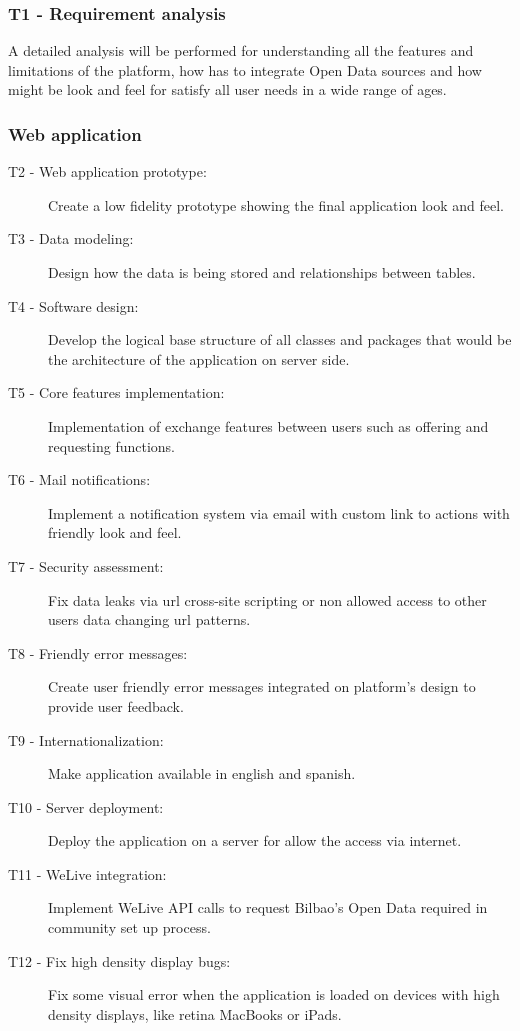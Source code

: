 \documentclass{DeustoFDP}
\begin{document}
\subsubsection{T1 - Requirement analysis}
A detailed analysis will be performed for understanding all the features and limitations of the platform, how has to integrate Open Data sources and how might be look and feel for satisfy all user needs in a wide range of ages.
\subsubsection{Web application}
\begin{description}
	\item[T2 - Web application prototype:] Create a low fidelity prototype showing the final application look and feel.
	\item[T3 - Data modeling:] Design how the data is being stored and relationships between tables. 
	\item[T4 - Software design:] Develop the logical base structure of all classes and packages that would be the architecture of the application on server side.
	\item[T5 - Core features implementation:] Implementation of exchange features between users such as offering and requesting functions.
	\item[T6 - Mail notifications:] Implement a notification system via email with custom link to actions with friendly look and feel.
	\item[T7 - Security assessment:] Fix data leaks via url cross-site scripting or non allowed access to other users data changing url patterns.
	\item[T8 - Friendly error messages:] Create user friendly error messages integrated on platform's design to provide user feedback.
	\item[T9 - Internationalization:] Make application available in english and spanish.
	\item[T10 - Server deployment:] Deploy the application on a server for allow the access via internet.
	\item[T11 - WeLive integration:] Implement WeLive API calls to request Bilbao's Open Data required in community set up process.
	\item[T12 - Fix high density display bugs:] Fix some visual error when the application is loaded on devices with high density displays, like retina MacBooks or iPads.
\end{description}
\end{document}
